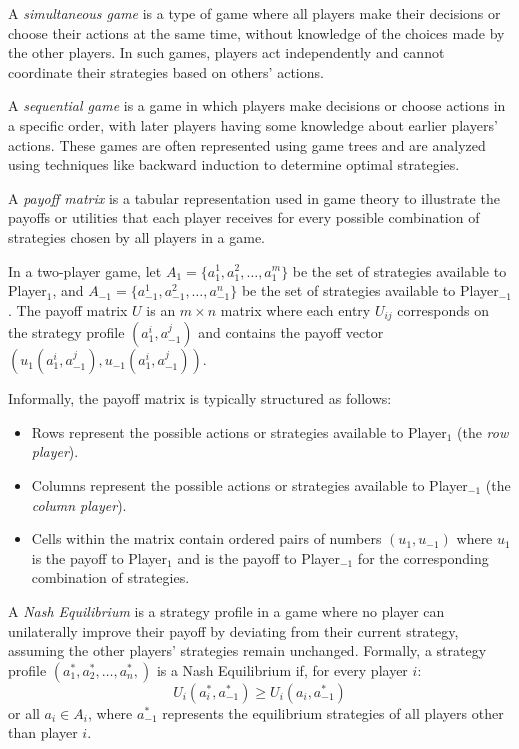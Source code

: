 \begin{definition}
A \emph{simultaneous game} is a type of game where all players make their decisions or choose their actions at the same time, without knowledge of the choices made by the other players. In such games, players act independently and cannot coordinate their strategies based on others' actions.
\end{definition}

\begin{definition}
A \emph{sequential game} is a game in which players make decisions or choose actions in a specific order, with later players having some knowledge about earlier players' actions. These games are often represented using game trees and are analyzed using techniques like backward induction to determine optimal strategies.
\end{definition}

\begin{definition}
A \emph{payoff matrix} is a tabular representation used in game theory to illustrate the payoffs or utilities that each player receives for every possible combination of strategies chosen by all players in a game. 

In a two-player game, let $A_1 = \{a_1^1, a_1^2,\dots, a_1^m\}$ be the set of strategies available to Player$_1$, and $A_{-1} = \{a_{-1}^1, a_{-1}^2,\dots, a_{-1}^n\}$ be the set of strategies available to Player$_{-1}$. The payoff matrix $U$ is an $m\times n$ matrix where each entry $U_{ij}$ corresponds on the strategy profile $(a_1^i, a_{-1}^j)$ and contains the payoff vector $(u_1(a_1^i, a_{-1}^j), u_{-1}(a_1^i, a_{-1}^j))$.

Informally, the payoff matrix is typically structured as follows:
\begin{itemize}
    \item Rows represent the possible actions or strategies available to Player$_1$ (the \emph{row player}).
    \item Columns represent the possible actions or strategies available to Player$_{-1}$ (the \emph{column player}).
    \item Cells within the matrix contain ordered pairs of numbers $(u_1, u_{-1})$ where $u_1$ is the payoff to Player$_1$ and is the payoff to Player$_{-1}$ for the corresponding combination of strategies. 
\end{itemize}
\end{definition}

\begin{definition}
A \emph{Nash Equilibrium} is a strategy profile in a game where no player can unilaterally improve their payoff by deviating from their current strategy, assuming the other players' strategies remain unchanged. Formally, a strategy profile $(a_1^*,a_2^*,\dots, a_n^*,)$ is a Nash Equilibrium if, for every player $i$: $$U_i(a_i^*, a_{-1}^*)\geq U_i(a_i, a_{-1}^*)$$ or all $a_i\in A_i$, where $a_{-1}^*$ represents the equilibrium strategies of all players other than player $i$.
\end{definition}

